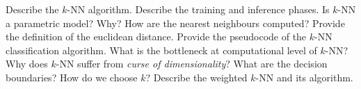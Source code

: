 \newpage
\begin{exercise}[topsep=20pt,itemsep=10pt]
    \ex Describe the \(k\)-NN algorithm.
    \ex[!] Describe the training and inference phases.
    \ex[!] Is \(k\)-NN a parametric model? Why?
    \ex How are the nearest neighbours computed? Provide the definition of the euclidean distance.
    \ex Provide the pseudocode of the \(k\)-NN classification algorithm.
    \ex What is the bottleneck at computational level of \(k\)-NN?
    \ex[!] Why does \(k\)-NN suffer from \emph{curse of dimensionality}?
    \ex What are the decision boundaries?
    \ex[!] How do we choose \(k\)?
    \ex Describe the weighted \(k\)-NN and its algorithm.
\end{exercise}